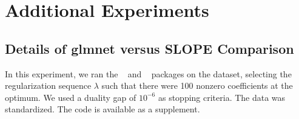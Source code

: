 \section{Additional Experiments}

\subsection{Details of \textsf{glmnet} versus \textsf{SLOPE} Comparison}
\label{sec:slope-vs-glmnet}

In this experiment, we ran the ~\parencite{friedman2022} and ~\parencite{larsson2022d} packages on the  dataset, selecting the regularization sequence \(\lambda\) such that there were 100 nonzero coefficients at the optimum.
We used a duality gap of \(10^{-6}\) as stopping criteria.
The data was standardized.
The code is available as a supplement.

